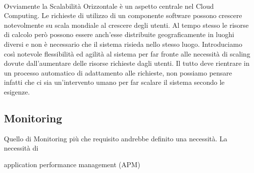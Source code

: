 \paragraph{}
Ovviamente la Scalabilità Orizzontale è un aspetto centrale nel Cloud Computing. Le richieste di utilizzo di un componente software possono crescere notevolmente su scala mondiale al crescere degli utenti. Al tempo stesso le risorse di calcolo però possono essere anch'esse distribuite geograficamente in luoghi diversi e non è necessario che il sistema risieda nello stesso luogo. Introduciamo così notevole flessibilità ed agilità al sistema per far fronte alle necessità di scaling dovute dall'aumentare delle risorse richieste dagli utenti. Il tutto deve rientrare in un processo automatico di adattamento alle richieste, non possiamo pensare infatti che ci sia un'intervento umano per far scalare il sistema secondo le esigenze.

\subsection{Monitoring}
Quello di Monitoring più che requisito andrebbe definito una necessità. La necessità di 

 application performance management (APM)

























